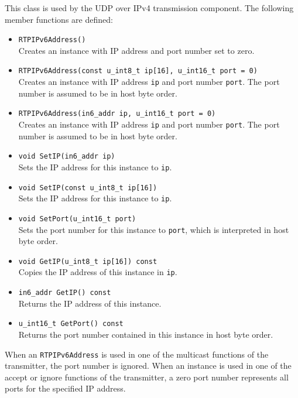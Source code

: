 \documentclass[12pt,a4paper]{article}
\begin{document}
					This class is used by the UDP over IPv4 transmission component.
					The following member functions are defined:
					\begin{itemize}
						\item {\tt RTPIPv6Address()}\\
							Creates an instance with IP address and port number set to
							zero.
						\item {\tt RTPIPv6Address(const u\_int8\_t ip[16], u\_int16\_t port = 0)}\\
							Creates an instance with IP address {\tt ip} and port
							number {\tt port}. The port number is assumed to be in
							host byte order.
						\item {\tt RTPIPv6Address(in6\_addr ip, u\_int16\_t port = 0)}\\
							Creates an instance with IP address {\tt ip} and port
							number {\tt port}. The port number is assumed to be in
							host byte order.
						\item {\tt void SetIP(in6\_addr ip)}\\
							Sets the IP address for this instance to {\tt ip}.
						\item {\tt void SetIP(const u\_int8\_t ip[16])}\\
							Sets the IP address for this instance to {\tt ip}.
						\item {\tt void SetPort(u\_int16\_t port)}\\
							Sets the port number for this instance to {\tt port}, which
							is interpreted in host byte order.
						\item {\tt void GetIP(u\_int8\_t ip[16]) const}\\
							Copies the IP address of this instance in {\tt ip}.
						\item {\tt in6\_addr GetIP() const}\\
							Returns the IP address of this instance.
						\item {\tt u\_int16\_t GetPort() const}\\
							Returns the port number contained in this instance in
							host byte order.
					\end{itemize}
					
					When an {\tt RTPIPv6Address} is used in one of the multicast
					functions of the transmitter, the port number is ignored. When
					an instance is used in one of the accept or ignore functions
					of the transmitter, a zero port number represents all ports
					for the specified IP address.
\end{document}
